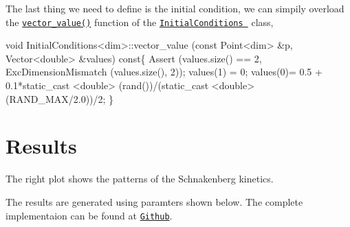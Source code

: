  The last thing we need to define is the initial condition, we can simpily overload the \href{../html/class_initial_conditions.html#aa10cfdd7350c3810a8deab707f397657}{\tt vector\-\_\-value()} function of the \href{../html/class_initial_conditions.html}{\tt Initial\-Conditions } class, 
\begin{DoxyCode}
\textcolor{keywordtype}{void} InitialConditions<dim>::vector_value (\textcolor{keyword}{const} Point<dim>   &p, Vector<double>   &values)\textcolor{keyword}{ const}\{
  Assert (values.size() == 2, ExcDimensionMismatch (values.size(), 2));
  values(1) = 0;    
  values(0)= 0.5 + 0.1*static\_cast <\textcolor{keywordtype}{double}> (rand())/(static\_cast <double>(RAND\_MAX/2.0))/2;
\}
\end{DoxyCode}
 \hypertarget{growth_results}{}\section{Results}\label{growth_results}
The right plot shows the patterns of the Schnakenberg kinetics.  

The results are generated using paramters shown below. The complete implementaion can be found at \href{https://github.com/mechanoChem/mechanoChemFEM/tree/example/Example1_diffusion_eaction}{\tt Github}.


